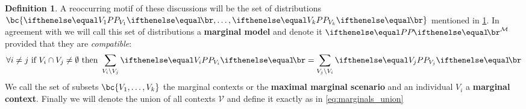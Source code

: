 \documentclass[aps, 10pt, english, twoside, pra, nofootinbib, longbibliography]{revtex4-1}
\theoremstyle{plain}
\theoremstyle{definition}
\newtheorem{definition}[theorem]{Definition}
\theoremstyle{remark}
\newcommand{\term}[1]{\textcolor{Mahogany}{\textbf{#1}}}
\begin{document}
    \begin{definition}
        \label{def:marginal_model}
        A reoccurring motif of these discussions will be the set of distributions $\bc{\prob[V_1], \ldots, \prob[V_k]}$ mentioned in \cref{def:marginal_model}. In agreement with \cite{Fritz_2011} we will call this set of distributions a \term{marginal model} and denote it $\prob^\mathcal{M}$ provided that they are \textit{compatible}:
        \[ \forall i \neq j \text{ if } V_i \cap V_j \neq \emptyset \text{ then } \sum_{V_i \setminus V_j} \prob[V_i] = \sum_{V_j \setminus V_i} \prob[V_j]  \]
        We call the set of subsets $\bc{V_1, \ldots, V_k}$ the marginal contexts or the \term{maximal marginal scenario} and an individual $V_i$ a \term{marginal context}. Finally we will denote the union of all contexts $\mathcal{V}$ and define it exactly as in \cref{eq:marginals_union}
    \end{definition}

\end{document}
